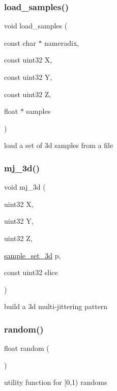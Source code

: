 \subsubsection{\texorpdfstring{load\+\_\+samples()}{load\_samples()}}
{\footnotesize\ttfamily void load\+\_\+samples (\begin{DoxyParamCaption}\item[{const char $\ast$}]{nameradix,  }\item[{const uint32}]{X,  }\item[{const uint32}]{Y,  }\item[{const uint32}]{Z,  }\item[{float $\ast$}]{samples }\end{DoxyParamCaption})\hspace{0.3cm}{\ttfamily [inline]}}

load a set of 3d samples from a file \mbox{\label{group___sampling_module_ga74a2d233874c14c777b4a1f7de6dcad7}} 
\subsubsection{\texorpdfstring{mj\+\_\+3d()}{mj\_3d()}}
{\footnotesize\ttfamily void mj\+\_\+3d (\begin{DoxyParamCaption}\item[{uint32}]{X,  }\item[{uint32}]{Y,  }\item[{uint32}]{Z,  }\item[{\hyperlink{structsample__set__3d}{sample\+\_\+set\+\_\+3d}}]{p,  }\item[{const uint32}]{slice }\end{DoxyParamCaption})\hspace{0.3cm}{\ttfamily [inline]}}

build a 3d multi-\/jittering pattern \mbox{\label{group___sampling_module_gaec17bbbfd36295353081b7b4480d933d}} 
\subsubsection{\texorpdfstring{random()}{random()}}
{\footnotesize\ttfamily float random (\begin{DoxyParamCaption}{ }\end{DoxyParamCaption})\hspace{0.3cm}{\ttfamily [inline]}}

utility function for \mbox{[}0,1) randoms 